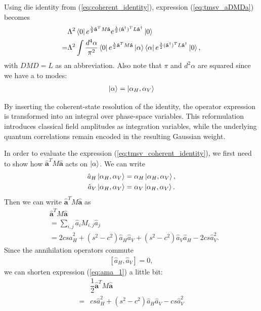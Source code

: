 \documentclass[%
 reprint,
 amsmath,amssymb,
 aps,
twocolumn
]{revtex4-2}
\begin{document}
Using die identity from (\ref{eq:coherent_identity}), expression (\ref{eq:tmsv_aDMDa}) becomes
\begin{align}
&\Lambda^2\bra{0} e^{\frac{\lambda}{2} \mathbf{\hat a}^T M\mathbf{\hat a}}
e^{\frac{\lambda}{2} (\mathbf{\hat a^{\dagger}})^T L \mathbf{\hat a^{\dagger}}}\ket{0} \\
=&\Lambda^2\int \dfrac{d^4\alpha}{\pi^2}   \bra{0} e^{\frac{\lambda}{2} \mathbf{\hat a}^T M\mathbf{\hat a}}\ket{\alpha}\bra{\alpha}e^{\frac{\lambda}{2} (\mathbf{\hat a^{\dagger}})^T L \mathbf{\hat a^{\dagger}}} \ket{0}\label{eq:tmsv_coherent_identity},
\end{align}
with $DMD=L$ as an abbreviation. Also note that $\pi$ and $d^2\alpha$ are squared since we have a to modes:
\begin{align}
\ket{\alpha}=\ket{\alpha_H,\alpha_V}
\end{align}

By inserting the coherent-state resolution of the identity, the operator expression is transformed into an integral over phase-space variables. This reformulation introduces classical field amplitudes as integration variables, while the underlying quantum correlations remain encoded in the resulting Gaussian weight. 

In order to evaluate the expression (\ref{eq:tmsv_coherent_identity}), we first need to show how $\mathbf{\hat a}^T M\mathbf{\hat a}$ acts on $\ket{\alpha}$. We can write 
\begin{align}
\hat a_{H}\ket{\alpha_H,\alpha_V}&=\alpha_{H}\ket{\alpha_H,\alpha_V},\\
\hat a_{V}\ket{\alpha_H,\alpha_V}&=\alpha_{V}\ket{\alpha_H,\alpha_V}.
\end{align}
Then we can write $\mathbf{\hat a}^T M\mathbf{\hat a}$ as
\begin{align}\label{eq:ama_1}
&\mathbf{\hat a}^T M\mathbf{\hat a}\\
&=\sum_{i,j}\hat a_i M_{i,j}\hat a_j\\
&=2cs\hat a_H^2+(s^2-c^2)\hat a_H\hat a_V+(s^2-c^2)\hat a_V\hat a_H-2cs\hat a_V^2.
\end{align}
Since the annihilation operators commute
\begin{align}
\left[\hat a_H,\hat a_V\right]=0,
\end{align}
we can shorten expression (\ref{eq:ama_1}) a little bit:
\begin{align}
&\dfrac{1}{2}\mathbf{\hat a}^T M\mathbf{\hat a}\\
=&cs\hat a_H^2+(s^2-c^2)\hat a_H\hat a_V-cs\hat a_V^2
\end{align}
\end{document}
